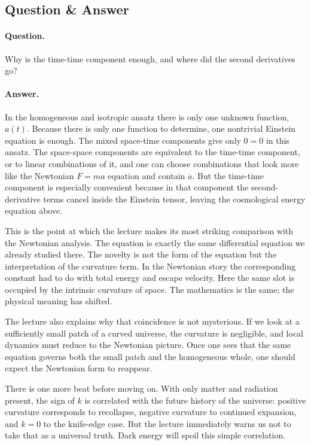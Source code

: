 \subsection{Question \& Answer}

\paragraph{Question.} Why is the time-time component enough, and where did the second derivatives go?

\paragraph{Answer.} In the homogeneous and isotropic ansatz there is only one unknown function, \(a(t)\). Because there is only one function to determine, one nontrivial Einstein equation is enough. The mixed space-time components give only \(0=0\) in this ansatz. The space-space components are equivalent to the time-time component, or to linear combinations of it, and one can choose combinations that look more like the Newtonian \(F=ma\) equation and contain \(\ddot a\). But the time-time component is especially convenient because in that component the second-derivative terms cancel inside the Einstein tensor, leaving the cosmological energy equation above.

This is the point at which the lecture makes its most striking comparison with the Newtonian analysis. The equation is exactly the same differential equation we already studied there. The novelty is not the form of the equation but the interpretation of the curvature term. In the Newtonian story the corresponding constant had to do with total energy and escape velocity. Here the same slot is occupied by the intrinsic curvature of space. The mathematics is the same; the physical meaning has shifted.

The lecture also explains why that coincidence is not mysterious. If we look at a sufficiently small patch of a curved universe, the curvature is negligible, and local dynamics must reduce to the Newtonian picture. Once one sees that the same equation governs both the small patch and the homogeneous whole, one should expect the Newtonian form to reappear.

There is one more beat before moving on. With only matter and radiation present, the sign of \(k\) is correlated with the future history of the universe: positive curvature corresponds to recollapse, negative curvature to continued expansion, and \(k=0\) to the knife-edge case. But the lecture immediately warns us not to take that as a universal truth. Dark energy will spoil this simple correlation.

